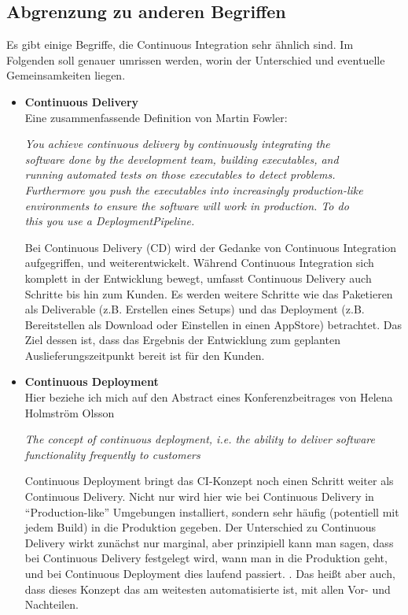 \subsection*{Abgrenzung zu anderen Begriffen}
Es gibt einige Begriffe, die Continuous Integration sehr ähnlich sind. Im Folgenden soll genauer umrissen werden, worin der Unterschied und eventuelle Gemeinsamkeiten liegen.
\begin{itemize}
	\item\textbf{Continuous Delivery}\label{Continuous Delivery}\\
	Eine zusammenfassende Definition von Martin Fowler:
\begin{center}
	\textit{
	You achieve continuous delivery by continuously integrating the \\software done by the development team, building executables, and\\ running automated tests on those executables to detect problems. \\Furthermore you push the executables into increasingly production-like \\environments to ensure the software will work in production. To do \\this you use a DeploymentPipeline.}\\ \cite{fowler-CD}
\end{center}
	Bei Continuous Delivery (CD) wird der Gedanke von Continuous Integration aufgegriffen, und weiterentwickelt. Während Continuous Integration sich komplett in der Entwicklung bewegt, umfasst Continuous Delivery auch Schritte bis hin zum Kunden. Es werden weitere Schritte wie das Paketieren als Deliverable (z.B. Erstellen eines Setups) und das Deployment (z.B. Bereitstellen als Download oder Einstellen in einen AppStore) betrachtet. Das Ziel dessen ist, dass das Ergebnis der Entwicklung zum geplanten Auslieferungszeitpunkt bereit ist für den Kunden.\\
	\item\textbf{Continuous Deployment}\label{Continuous Deployment}\\
	Hier beziehe ich mich auf den Abstract eines Konferenzbeitrages von Helena Holmström Olsson
	\begin{center}
		\textit{
		The concept of continuous deployment, i.e. the ability to deliver software functionality frequently to customers \textelp{}}\\
		\cite{olsson2012climbing}
	\end{center}
	Continuous Deployment bringt das CI-Konzept noch einen Schritt weiter als Continuous Delivery. Nicht nur wird hier wie bei Continuous Delivery in "`Production-like"' Umgebungen installiert, sondern sehr häufig (potentiell mit jedem Build) in die Produktion gegeben. Der Unterschied zu Continuous Delivery wirkt zunächst nur marginal, aber prinzipiell kann man sagen, dass bei Continuous Delivery festgelegt wird, wann man in die Produktion geht, und bei Continuous Deployment dies laufend passiert. \cite{scrum-overview-ci-cd}. Das heißt aber auch, dass dieses Konzept das am weitesten automatisierte ist, mit allen Vor- und Nachteilen.
	
	
\end{itemize}


